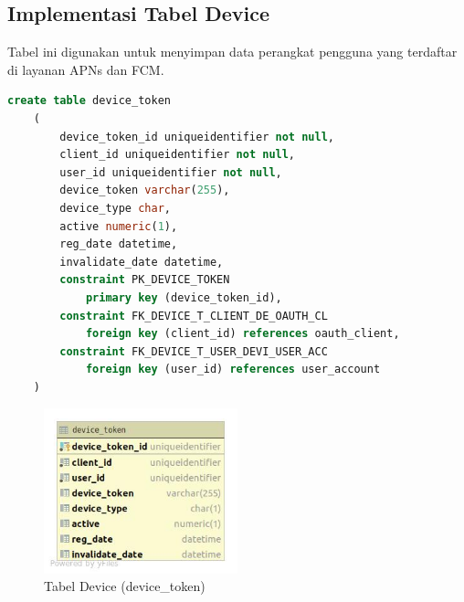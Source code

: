 \subsection{Implementasi Tabel Device}
\par Tabel ini digunakan untuk menyimpan data perangkat pengguna yang terdaftar di layanan APNs dan FCM.
\begin{lstlisting}[language=sql, firstnumber=1, caption=Implementasi Tabel Device]
    create table device_token
    (
        device_token_id uniqueidentifier not null,
        client_id uniqueidentifier not null,
        user_id uniqueidentifier not null,
        device_token varchar(255),
        device_type char,
        active numeric(1),
        reg_date datetime,
        invalidate_date datetime,
        constraint PK_DEVICE_TOKEN
            primary key (device_token_id),
        constraint FK_DEVICE_T_CLIENT_DE_OAUTH_CL
            foreign key (client_id) references oauth_client,
        constraint FK_DEVICE_T_USER_DEVI_USER_ACC
            foreign key (user_id) references user_account
    )
\end{lstlisting}
\begin{figure}[H]
    \centering\includegraphics[width=0.5\textwidth]{bab4/figures/tabel_device_token.jpg}
    \caption{Tabel Device (device\_token)}
    \label{tabel_device_token}
\end{figure}

